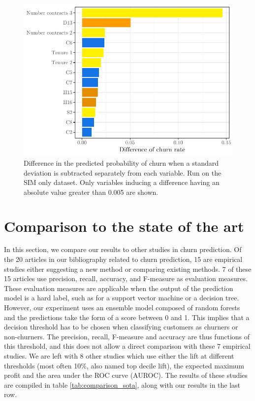 \begin{figure}
    \centering
    \includegraphics[width=0.9\linewidth]{figures/offset_1m.pdf}
    \caption{Difference in the predicted probability of churn when a standard
    deviation is subtracted separately from each variable. Run on the SIM only
    dataset. Only variables inducing a difference having an absolute value
    greater than 0.005 are shown.}
    \label{fig:offset_1m}
\end{figure}

\section{Comparison to the state of the art}

In this section, we compare our results to other studies in churn prediction. Of
the 20 articles in our bibliography related to churn prediction, 15 are
empirical studies either suggesting a new method or comparing existing methods.
7 of these 15 articles use precision, recall, accuracy, and F-measure as
evaluation measures. These evaluation measures are applicable when the output of
the prediction model is a hard label, such as for a support vector machine or a
decision tree. However, our experiment uses an ensemble model composed of random
forests and the predictions take the form of a score between 0 and 1. This
implies that a decision threshold has to be chosen when classifying customers as
churners or non-churners. The precision, recall, F-measure and accuracy are thus
functions of this threshold, and this does not allow a direct comparison with
these 7 empirical studies. We are left with 8 other studies which use either the
lift at different thresholds (most often 10\%, also named top decile lift), the
expected maximum profit and the area under the ROC curve (AUROC). The results of
these studies are compiled in table \ref{tab:comparison_sota}, along with our
results in the last row.

